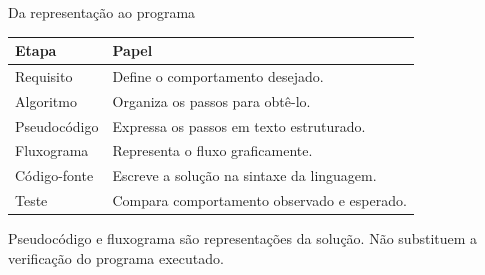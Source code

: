 \begin{frame}[t]{Da representação ao programa}
\begin{center}\begin{tabularx}{\textwidth}{lX}\toprule
Etapa & Papel\\\midrule
Requisito & Define o comportamento desejado.\\
Algoritmo & Organiza os passos para obtê-lo.\\
Pseudocódigo & Expressa os passos em texto estruturado.\\
Fluxograma & Representa o fluxo graficamente.\\
Código-fonte & Escreve a solução na sintaxe da linguagem.\\
Teste & Compara comportamento observado e esperado.\\\bottomrule
\end{tabularx}\end{center}
\small Pseudocódigo e fluxograma são representações da solução. Não substituem a verificação do programa executado.
\end{frame}
